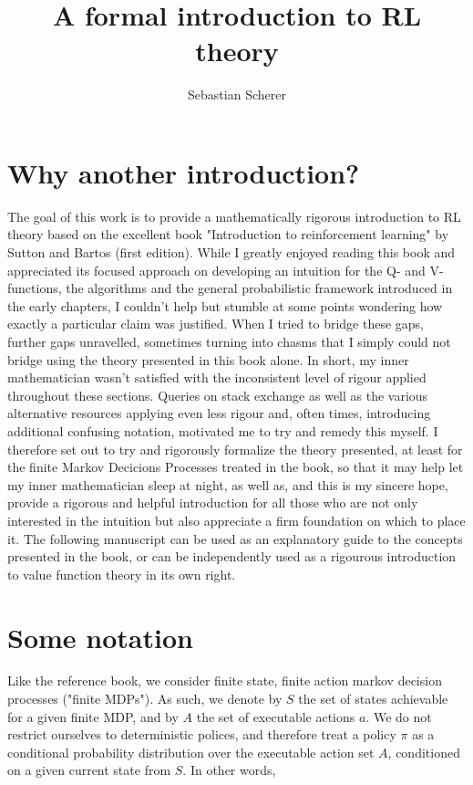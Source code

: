 \documentclass[11pt]{article} %
\title{A formal introduction to RL theory}
\author{Sebastian Scherer}
\begin{document}
\maketitle

\section{Why another introduction?}

The goal of this work is to provide a mathematically rigorous introduction to RL theory based on the excellent book "Introduction to reinforcement learning" by Sutton and Bartos (first edition). While I greatly enjoyed reading this book and appreciated its focused approach on developing an intuition for the Q- and V-functions, the algorithms and the general probabilistic framework introduced in the early chapters, I couldn't help but stumble at some points wondering how exactly a particular claim was justified. When I tried to bridge these gaps, further gaps unravelled, sometimes turning into chasms that I simply could not bridge using the theory presented in this book alone. In short, my inner mathematician wasn't satisfied with the inconsistent level of rigour applied throughout these sections. Queries on stack exchange as well as the various alternative resources applying even less rigour and, often times, introducing additional confusing notation, motivated me to  try and remedy this myself. I therefore set out to try and rigorously formalize the theory presented, at least for the finite Markov Decicions Processes treated in the book, so that it may help let my inner mathematician sleep at night, as well as, and this is my sincere hope, provide a rigorous and helpful introduction for all those who are not only interested in the intuition but also appreciate a firm foundation on which to place it. The following manuscript can be used as an explanatory guide to the concepts presented in the book, or can be independently used as a rigourous introduction to value function theory in its own right.

\section{Some notation}

Like the reference book, we consider finite state, finite action markov decision processes ("finite MDPs"). As such, we denote by $S$ the set of states achievable for a given finite MDP, and by $A$ the set of executable actions $a$. We do not restrict ourselves to deterministic polices, and therefore treat a policy $\pi$ as a conditional probability distribution over the executable action set $A$, conditioned on a given current state from $S$. In other words, 
\end{document}

